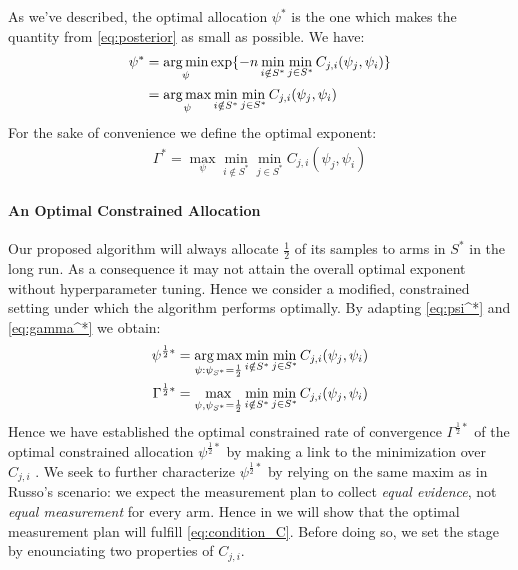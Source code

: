 As we've described, the optimal allocation $\psi^*$ is the one which makes the quantity from \eqref{eq:posterior} as small as possible. We have:
\begin{align}
  \psi^* &= \operatorname*{arg\,min}_{\psi} \exp\{-n \min_{i \notin S^*}\min_{j \in S^*} C_{j, i}(\psi_j, \psi_i)\} \\
    &= \operatorname*{arg\,max}_{\psi} \min_{i \notin S^*}\min_{j \in S^*} C_{j, i}(\psi_j, \psi_i) \label{eq:psi^*}
\end{align}
For the sake of convenience we define the optimal exponent:
\begin{align}
  \Gamma^* = \max_{\psi} \min_{i \notin S^*}\min_{j \in S^*} C_{j, i}(\psi_j, \psi_i) \label{eq:gamma^*}
\end{align}

\paragraph{An Optimal Constrained Allocation}


Our proposed algorithm will always allocate $\frac{1}{2}$ of its samples to arms in $S^*$ in the long run. As a consequence it may not attain the overall optimal exponent without hyperparameter tuning. Hence we consider a modified, constrained setting under which the algorithm performs optimally. By adapting \eqref{eq:psi^*} and \eqref{eq:gamma^*} we obtain:
\begin{align}
  \psi^{\frac{1}{2}*} &= \operatorname*{arg\,max}_{\psi: \psi_{S^*}=\frac{1}{2}} \min_{i \notin S^*}\min_{j \in S^*} C_{j, i}(\psi_j, \psi_i) \label{eq:constrained_optimal_psi}\\
  \Gamma^{\frac{1}{2}*} &= \max_{\psi, \psi_{S^*} = \frac{1}{2}} \min_{i \notin S^*} \min_{j \in S^*} C_{j, i}(\psi_j, \psi_i) \label{eq:constrained_optimal_gamma}
\end{align}
Hence we have established the optimal constrained rate of convergence $\Gamma^{\frac{1}{2}*}$ of the optimal constrained allocation $\psi^{\frac{1}{2}*}$ by making a link to the minimization over $C_{j, i}$ . We seek to further characterize $\psi^{\frac{1}{2}*}$ by relying on the same maxim as in Russo's scenario: we expect the measurement plan to collect \emph{equal evidence}, not \emph{equal measurement} for every arm. Hence in  we will show that the optimal measurement plan will fulfill \eqref{eq:condition_C}. Before doing so, we set the stage by enounciating two properties of $C_{j, i}$.

